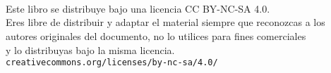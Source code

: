 \documentclass[10pt, a4paper]{article}
\makeatletter
\def\maxwidth{\ifdim\Gin@nat@width>\linewidth\linewidth
\else\Gin@nat@width\fi}
\let\Oldincludegraphics\includegraphics
\renewcommand{\includegraphics}[1]{\Oldincludegraphics[width=\maxwidth]{#1}}
\newif\IfInSansMode
\let\oldsf\sffamily
\renewcommand*{\sffamily}{\oldsf\sansmath\InSansModetrue}
\makeatother
\begin{document}

\afterpage{\restorepagecolor} %
\begin{titlepage}

	\parbox[t]{\textwidth}{
			\raggedright %
			\fontsize{50pt}{50pt}\selectfont\sffamily\color{white}{
			  \textbf{\asignatura}
      }
	}

	\vfill

	\parbox[t]{\textwidth}{
		\raggedright %
		\sffamily\large\color{white}
		{\Large \autor }\\[4pt]
		\grado\\
		\universidad\\[4pt]
		\texttt{\enlaceweb}
	}

\end{titlepage}


\thispagestyle{empty}
\null
\vfill

\parbox[t]{\textwidth}{
  \raggedright %
  \sffamily\large
  {\Large Este libro se distribuye bajo una licencia CC BY-NC-SA 4.0.}\\[4pt]
  Eres libre de distribuir y adaptar el material siempre que reconozcas a los\\
  autores originales del documento, no lo utilices para fines comerciales\\
  y lo distribuyas bajo la misma licencia.\\[4pt]
  \texttt{creativecommons.org/licenses/by-nc-sa/4.0/}
}


\begin{titlepage}

	\parbox[t]{\textwidth}{
			\raggedright %
			\fontsize{50pt}{50pt}\selectfont\sffamily\color{500}{
			  \textbf{\asignatura}
      }
	}

	\vfill

	\parbox[t]{\textwidth}{
		\raggedright %
		\sffamily\large
		{\Large \autor}\\[4pt]
		\grado\\
		\universidad\\[4pt]
		\texttt{\enlaceweb}
	}

\end{titlepage}
\end{document}
